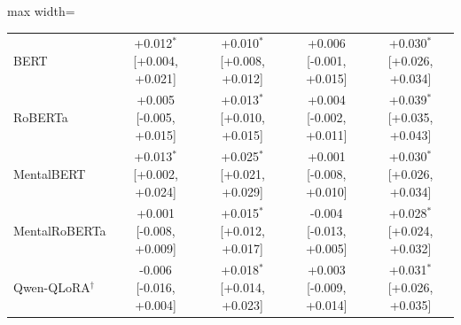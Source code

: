 \begin{table}[t]
\begin{adjustbox}{max width=\textwidth}
\begin{tabular}{lcccc}
BERT & +0.012$^{*}$ \tiny[+0.004, +0.021] & +0.010$^{*}$ \tiny[+0.008, +0.012] & +0.006 \tiny[-0.001, +0.015] & +0.030$^{*}$ \tiny[+0.026, +0.034] \\
RoBERTa & +0.005 \tiny[-0.005, +0.015] & +0.013$^{*}$ \tiny[+0.010, +0.015] & +0.004 \tiny[-0.002, +0.011] & +0.039$^{*}$ \tiny[+0.035, +0.043] \\
MentalBERT & +0.013$^{*}$ \tiny[+0.002, +0.024] & +0.025$^{*}$ \tiny[+0.021, +0.029] & +0.001 \tiny[-0.008, +0.010] & +0.030$^{*}$ \tiny[+0.026, +0.034] \\
MentalRoBERTa & +0.001 \tiny[-0.008, +0.009] & +0.015$^{*}$ \tiny[+0.012, +0.017] & -0.004 \tiny[-0.013, +0.005] & +0.028$^{*}$ \tiny[+0.024, +0.032] \\
Qwen-QLoRA$^{\dagger}$ & -0.006 \tiny[-0.016, +0.004] & +0.018$^{*}$ \tiny[+0.014, +0.023] & +0.003 \tiny[-0.009, +0.014] & +0.031$^{*}$ \tiny[+0.026, +0.035] \\
\bottomrule
\end{tabular}
\end{adjustbox}
\end{table}
